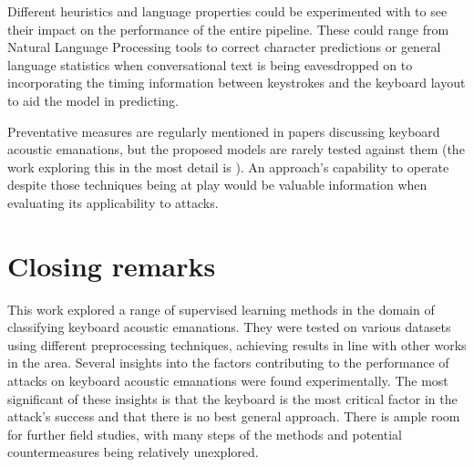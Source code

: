 \documentclass[../main.tex]{subfiles}
\begin{document}
Different heuristics and language properties could be experimented with to see their impact on the performance of the 
entire pipeline. These could range from Natural Language Processing tools to correct character predictions or general
language statistics when conversational text is being eavesdropped on to incorporating the timing information between 
keystrokes and the keyboard layout to aid the model in predicting. 

Preventative measures are regularly mentioned in papers discussing keyboard acoustic emanations, but the proposed 
models are rarely tested against them (the work exploring this in the most detail is \cite{defenses2018}).
An approach's capability to operate despite those techniques being at play would be valuable information when
evaluating its applicability to attacks.



\section{Closing remarks}
% 
This work explored a range of supervised learning methods in the domain of classifying keyboard acoustic emanations.
They were tested on various datasets using different preprocessing techniques, achieving
results in line with other works in the area. Several insights into the factors contributing to
the performance of attacks on keyboard acoustic emanations were found experimentally. The most significant of these
insights is that the keyboard is the most critical factor in the attack's success and that there is no
best general approach. There is ample room for further field studies, with many steps of the methods and
potential countermeasures being relatively unexplored.
\end{document}
